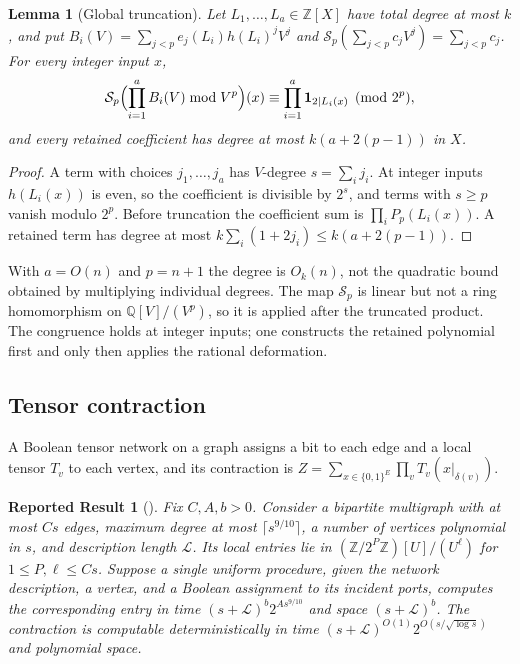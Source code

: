 \documentclass[11pt,reqno]{amsart}
\numberwithin{equation}{section}
\theoremstyle{plain}
\newtheorem{lemma}[theorem]{Lemma}
\newtheorem{reported}[theorem]{Reported Result}
\theoremstyle{definition}
\theoremstyle{remark}
\newcommand{\Z}{\mathbb Z}
\newcommand{\Q}{\mathbb Q}
\newcommand{\ind}{\mathbf 1}
\begin{document}
\begin{lemma}[Global truncation]\label{lem:global-degree}
Let $L_1,\dots,L_a\in\Z[X]$ have total degree at most $k$, and put
$B_i(V)=\sum_{j<p}e_j(L_i)h(L_i)^jV^j$ and
$\mathcal S_p(\sum_{j<p}c_jV^j)=\sum_{j<p}c_j$. For every integer input $x$,
\begin{equation}\label{eq:global-truncation}
 \mathcal S_p\Bigl(\prod_{i=1}^aB_i(V)\bmod V^p\Bigr)(x)\equiv
 \prod_{i=1}^a\ind_{2\mid L_i(x)}\pmod{2^p},
\end{equation}
and every retained coefficient has degree at most $k(a+2(p-1))$ in $X$.
\end{lemma}
\begin{proof}
A term with choices $j_1,\dots,j_a$ has $V$-degree $s=\sum_ij_i$. At integer
inputs $h(L_i(x))$ is even, so the coefficient is divisible by $2^s$, and
terms with $s\ge p$ vanish modulo $2^p$. Before truncation the coefficient sum
is $\prod_iP_p(L_i(x))$. A retained term has degree at most
$k\sum_i(1+2j_i)\le k(a+2(p-1))$.
\end{proof}
With $a=O(n)$ and $p=n+1$ the degree is $O_k(n)$, not the quadratic bound
obtained by multiplying individual degrees. The map $\mathcal S_p$ is linear
but not a ring homomorphism on $\Q[V]/(V^p)$, so it is applied after the
truncated product. The congruence holds at integer inputs; one constructs the
retained polynomial first and only then applies the rational deformation.

\subsection{Tensor contraction}
A Boolean tensor network on a graph assigns a bit to each edge and a local
tensor $T_v$ to each vertex, and its contraction is
$Z=\sum_{x\in\{0,1\}^{E}}\prod_vT_v(x|_{\delta(v)})$.

\begin{reported}[{\cite[Theorem~D.1]{OpenAIPaper}}]\label{rep:tensor}
Fix $C,A,b>0$. Consider a bipartite multigraph with at most $Cs$ edges,
maximum degree at most $\lceil s^{9/10}\rceil$, a number of vertices
polynomial in $s$, and description length $\mathcal L$. Its local entries
lie in $(\Z/2^P\Z)[U]/(U^\ell)$ for $1\le P,\ell\le Cs$. Suppose a single
uniform procedure, given the network description, a vertex, and a Boolean
assignment to its incident ports, computes the corresponding entry in time
$(s+\mathcal L)^b2^{As^{9/10}}$ and space $(s+\mathcal L)^b$. The contraction
is computable deterministically in time
$(s+\mathcal L)^{O(1)}2^{O(s/\sqrt{\log s})}$ and polynomial space.
\end{reported}
\end{document}
